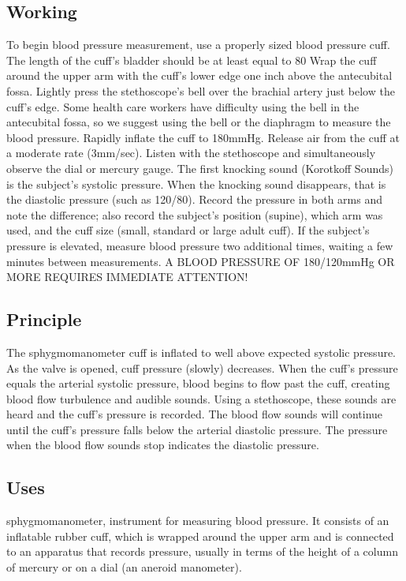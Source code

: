 \documentclass[12pt]{article}
\begin{document}
\subsection{Working}
To begin blood pressure measurement, use a properly sized blood pressure cuff. The length of the cuff's bladder should be at least equal to 80%
Wrap the cuff around the upper arm with the cuff's lower edge one inch above the antecubital fossa.
Lightly press the stethoscope's bell over the brachial artery just below the cuff's edge. Some health care workers have difficulty using the bell in the antecubital fossa, so we suggest using the bell or the diaphragm to measure the blood pressure.
Rapidly inflate the cuff to 180mmHg. Release air from the cuff at a moderate rate (3mm/sec).
Listen with the stethoscope and simultaneously observe the dial or mercury gauge. The first knocking sound (Korotkoff Sounds) is the subject's systolic pressure. When the knocking sound disappears, that is the diastolic pressure (such as 120/80).
Record the pressure in both arms and note the difference; also record the subject's position (supine), which arm was used, and the cuff size (small, standard or large adult cuff).
If the subject's pressure is elevated, measure blood pressure two additional times, waiting a few minutes between measurements.
A BLOOD PRESSURE OF 180/120mmHg OR MORE REQUIRES IMMEDIATE ATTENTION!

\subsection{Principle}
The sphygmomanometer cuff is inflated to well above expected systolic pressure. As the valve is opened, cuff pressure (slowly) decreases. When the cuff’s pressure equals the arterial systolic pressure, blood begins to flow past the cuff, creating blood flow turbulence and audible sounds. Using a stethoscope, these sounds are heard and the cuff’s pressure is recorded. The blood flow sounds will continue until the cuff’s pressure falls below the arterial diastolic pressure. The pressure when the blood flow sounds stop indicates the diastolic pressure.

\subsection{Uses}

sphygmomanometer, instrument for measuring blood pressure. It consists of an inflatable rubber cuff, which is wrapped around the upper arm and is connected to an apparatus that records pressure, usually in terms of the height of a column of mercury or on a dial (an aneroid manometer).
\end{document}
